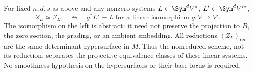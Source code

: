 \begin{theorem}
\label{thm:polar-system-torelli}
For fixed \(n,d,s\) as above and any nonzero systems
\(L\subset\Sym^dV^*\), \(L'\subset\Sym^dV'^*\),
\begin{equation}\label{eq:polar-system-torelli}
 Z_L\simeq Z_{L'}\quad\Longleftrightarrow\quad
           g^*L'=L\text{ for a linear isomorphism }g:V\to V'.
\end{equation}
The isomorphism on the left is abstract: it need not preserve the
projection to \(B\), the zero section, the grading, or an ambient
embedding.  All reductions \((Z_L)_{\mathrm{red}}\) are the same
determinant hypersurface in \(M\).  Thus the nonreduced scheme,
not its reduction, separates the projective-equivalence classes of
these linear systems.  No smoothness hypothesis on the hypersurfaces
or their base locus is required.
\end{theorem}
